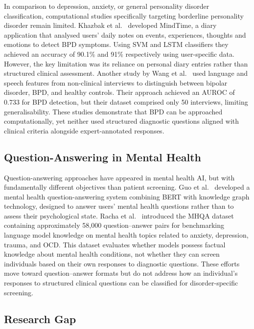 \documentclass[11pt]{article}
\begin{document}
In comparison to depression, anxiety, or general personality disorder classification,
computational studies specifically targeting borderline personality disorder remain limited.
Khazbak et al.~\cite{khazbak2021mindtime} developed MindTime, a diary application that analysed
users' daily notes on events, experiences, thoughts and emotions to detect BPD symptoms. Using
SVM and LSTM classifiers they achieved an accuracy of 90.1\% and 91\% respectively using
user-specific data. However, the key limitation was its reliance on personal diary entries rather
than structured clinical assessment. Another study by Wang et al.~\cite{wang2020learning} used
language and speech features from non-clinical interviews to distinguish between bipolar
disorder, BPD, and healthy controls. Their approach achieved an AUROC of 0.733 for BPD
detection, but their dataset comprised only 50 interviews, limiting generalisability. These
studies demonstrate that BPD can be approached computationally, yet neither used structured
diagnostic questions aligned with clinical criteria alongside expert-annotated responses.

\subsection{Question-Answering in Mental Health}

Question-answering approaches have appeared in mental health AI, but with fundamentally different
objectives than patient screening. Guo et al.~\cite{guo2021mental} developed a mental health
question-answering system combining BERT with knowledge graph technology, designed to answer
users' mental health questions rather than to assess their psychological state. Racha et
al.~\cite{racha2025mhqa} introduced the MHQA dataset containing approximately 58,000
question--answer pairs for benchmarking language model knowledge on mental health topics related
to anxiety, depression, trauma, and OCD. This dataset evaluates whether models possess factual
knowledge about mental health conditions, not whether they can screen individuals based on their
own responses to diagnostic questions. These efforts move toward question--answer formats but do
not address how an individual's responses to structured clinical questions can be classified for
disorder-specific screening.

\subsection{Research Gap}
\end{document}
